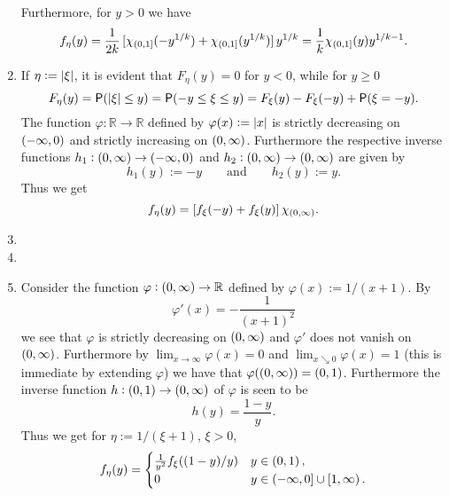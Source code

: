 \begin{enumerate}[label = \textbf{Exercise \arabic*.},wide = 0pt, itemsep=1.5ex]
		Furthermore, for $y > 0$ we have
		\begin{equation}
			f_\eta(y) = \frac{1}{2k}\sbr[0]{\chi_{\intoc{0,1}}(-y^{1/k}) + \chi_{\intoc{0,1}}(y^{1/k})}y^{1/k} = \frac{1}{k}\chi_{\intoc{0,1}}(y)y^{1/k - 1}.
		\end{equation}
	\item If $\eta := \abs[0]{\xi}$, it is evident that $F_\eta(y) = 0$ for $y < 0$, while for $y \geq 0$
		\begin{equation}
			F_\eta(y) = \Psf(\abs[0]{\xi} \leq y) = \Psf(-y \leq \xi \leq y) = F_\xi(y) - F_\xi(-y) + \Psf(\xi = - y).
		\end{equation} 
		The function $\varphi: \mathbb{R} \to \mathbb{R}$ defined by $\varphi(x) := \abs[0]{x}$ is strictly decreasing on $\intoo{-\infty,0}$ and strictly increasing on $\intoo{0,\infty}$. Furthermore the respective inverse functions $h_1: \intoo{0,\infty} \to \intoo{-\infty,0}$ and $h_2: \intoo{0,\infty} \to \intoo{0,\infty}$ are given by 
		\begin{equation}
			h_1(y) := -y \qquad \text{and} \qquad h_2(y) := y.
		\end{equation}
		Thus we get
		\begin{equation}
			f_\eta(y) = \sbr[0]{f_\xi(-y) + f_\xi(y)}\chi_{\intoo{0,\infty}}.
		\end{equation}
	\item
	\item
	\item Consider the function $\varphi: \intoo{0,\infty} \to \mathbb{R}$ defined by $\varphi(x) := 1/(x + 1)$. By 
		\begin{equation}
			\varphi'(x) = -\frac{1}{(x + 1)^2}
		\end{equation}
		\noindent we see that $\varphi$ is strictly decreasing on $\intoo{0,\infty}$ and $\varphi'$ does not vanish on $\intoo{0,\infty}$. Furthermore by $\lim_{x \to \infty}\varphi(x) = 0$ and $\lim_{x \searrow 0}\varphi(x) = 1$ (this is immediate by extending $\varphi$) we have that $\varphi(\intoo{0,\infty}) = \intoo{0,1}$. Furthermore the inverse function $h: \intoo{0,1} \to \intoo{0,\infty}$ of $\varphi$ is seen to be
		\begin{equation}
			h(y) = \frac{1 - y}{y}.
		\end{equation}
		Thus we get for $\eta := 1/(\xi + 1)$, $\xi > 0$,
		\begin{align*}
			f_\eta(y) = \begin{cases}
				\frac{1}{y^2}f_\xi ((1 - y)/y) & y \in \intoo{0,1},\\
				0 & y \in \intoc{-\infty,0} \cup \intco{1,\infty}.
			\end{cases}
		\end{align*}
\end{enumerate}
\printbibliography

